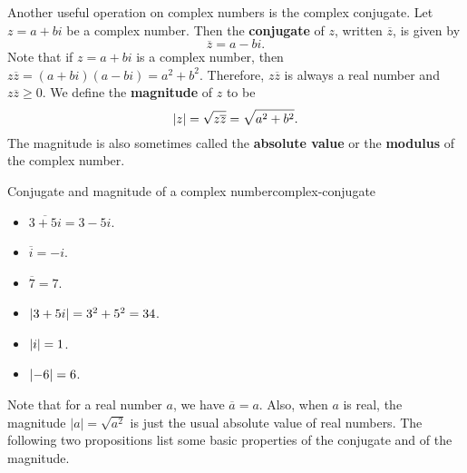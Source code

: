 Another useful operation on complex numbers is the complex
conjugate. Let $z = a+bi$ be a complex number. Then the
\textbf{conjugate}%
%
 of $z$, written $\overline{z}$, is given by
\begin{equation*}
  \overline{z} = a-bi.
\end{equation*}
Note that if $z=a+bi$ is a complex number, then
$z\overline{z} = (a+bi)(a-bi) = a^2+b^2$. Therefore, $z\overline{z}$
is always a real number and $z\overline{z}\geq 0$. We define the
\textbf{magnitude}%
 of $z$ to be
\begin{equation*}
  \left|z\right| = \sqrt{z\overline{z}} = \sqrt{a^2+b^2}.
\end{equation*}
The magnitude is also sometimes called the \textbf{absolute
  value}%
 or the
\textbf{modulus}%
 of the complex
number.

\begin{example}{Conjugate and magnitude of a complex number}{complex-conjugate}
  \begin{itemize}
  \item $\overline{3+5i} = 3-5i$.
  \item $\overline{i} = -i$.
  \item $\overline{7} = 7$.
  \item $\left|3+5i\right| = 3^2+5^2 = 34$.
  \item $\left|i\right| = 1$.
  \item $\left|-6\right| = 6$.
  \end{itemize}
\end{example}

Note that for a real number $a$, we have $\overline{a}=a$. Also, when
$a$ is real, the magnitude $|a| = \sqrt{a^2}$ is just the usual
absolute value of real numbers. The following two propositions
list some basic properties of the conjugate and of the magnitude.

